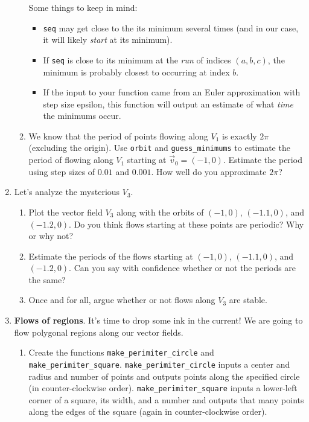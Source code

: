 \documentclass[letter]{article}
\begin{document}
\begin{enumerate}
\begin{enumerate}
					Some things to keep in mind:
					\begin{itemize}
						\item {\tt seq} may get close to the its minimum several times (and in our case, it will likely
							\emph{start} at its minimum).
						\item If {\tt seq} is close to its minimum at the \emph{run} of indices $(a,b,c)$,
							the minimum is probably closest to occurring at index $b$.
						\item If the input to your function came from an Euler approximation with step size epsilon,
							this function will output an estimate of what \emph{time} the minimums occur.
					\end{itemize}
				\item We know that the period of points flowing along $V_1$ is exactly $2\pi$ (excluding the origin).
					Use {\tt orbit} and \verb|guess_minimums| to estimate the period of flowing along
					$V_1$ starting at $\vec v_0=(-1,0)$. Estimate the period using step sizes of $0.01$ and $0.001$.
					How well do you approximate $2\pi$?
			\end{enumerate}
		\item Let's analyze the mysterious $V_3$.
			\begin{enumerate}
				\item Plot the vector field $V_3$ along with the orbits of $(-1,0)$, $(-1.1,0)$, and $(-1.2,0)$. Do you
					think flows starting at these points are periodic? Why or why not?
				\item Estimate the periods of the flows starting at $(-1,0)$, $(-1.1,0)$, and $(-1.2,0)$. Can you say with
					confidence whether or not the periods are the same?
					\label{REFPERIOD}
				\item Once and for all, argue whether or not flows along $V_3$ are stable.
			\end{enumerate}

		\item {\bf Flows of regions}. It's time to drop some ink in the current! We are going to flow polygonal regions along our vector
			fields.
			\begin{enumerate}
				\item Create the functions \verb|make_perimiter_circle| and \verb|make_perimiter_square|.
				\verb|make_perimiter_circle| inputs a center and radius and number of points and outputs points along
					the specified circle (in counter-clockwise order). \verb|make_perimiter_square| inputs a lower-left
					corner of a square, its width, and a number and outputs that many points along the edges of 
					the square (again in counter-clockwise order).


\end{enumerate}
\end{enumerate}
\end{document}
